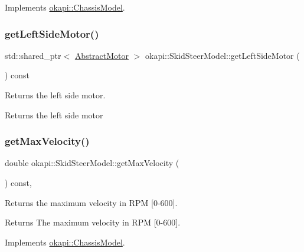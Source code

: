 Implements \mbox{\hyperlink{classokapi_1_1ChassisModel_ae39e8ccd15b6f84e32cd21fe99bdd6c9}{okapi\+::\+Chassis\+Model}}.

\mbox{\label{classokapi_1_1SkidSteerModel_a3f1813ada8205396c35abccbc0c9ff21}} 
\subsubsection{\texorpdfstring{getLeftSideMotor()}{getLeftSideMotor()}}
{\footnotesize\ttfamily std\+::shared\+\_\+ptr$<$ \mbox{\hyperlink{classokapi_1_1AbstractMotor}{Abstract\+Motor}} $>$ okapi\+::\+Skid\+Steer\+Model\+::get\+Left\+Side\+Motor (\begin{DoxyParamCaption}{ }\end{DoxyParamCaption}) const}

Returns the left side motor.

\begin{DoxyReturn}{Returns}
the left side motor 
\end{DoxyReturn}
\mbox{\label{classokapi_1_1SkidSteerModel_a7e2fcfb65e940ea4d71780966b4b5b68}} 
\subsubsection{\texorpdfstring{getMaxVelocity()}{getMaxVelocity()}}
{\footnotesize\ttfamily double okapi\+::\+Skid\+Steer\+Model\+::get\+Max\+Velocity (\begin{DoxyParamCaption}{ }\end{DoxyParamCaption}) const\hspace{0.3cm}{\ttfamily [override]}, {\ttfamily [virtual]}}

Returns the maximum velocity in R\+PM \mbox{[}0-\/600\mbox{]}.

\begin{DoxyReturn}{Returns}
The maximum velocity in R\+PM \mbox{[}0-\/600\mbox{]}. 
\end{DoxyReturn}


Implements \mbox{\hyperlink{classokapi_1_1ChassisModel_ab45dd7430636ed1c1dee25dae6df5d46}{okapi\+::\+Chassis\+Model}}.


